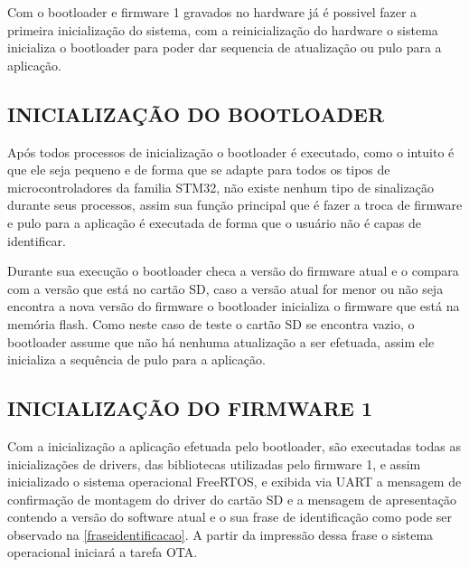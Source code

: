 Com o bootloader e firmware 1 gravados no hardware já é possivel fazer a primeira inicialização do sistema, com a reinicialização do hardware o sistema inicializa o bootloader para poder dar sequencia de atualização ou pulo para a aplicação.

\subsection{INICIALIZAÇÃO DO BOOTLOADER}
Após todos processos de inicialização o bootloader é executado, como o intuito é que ele seja pequeno e de forma que se adapte para todos os tipos de microcontroladores da familia STM32, não existe nenhum tipo de sinalização durante seus processos, assim sua função principal que é fazer a troca de firmware e pulo para a aplicação é executada de forma que o usuário não é capas de identificar.

Durante sua execução o bootloader checa a versão do firmware atual e o compara com a versão que está no cartão SD, caso a versão atual for menor ou não seja encontra a nova versão do firmware o bootloader inicializa o firmware que está na memória flash. Como neste caso de teste o cartão SD se encontra vazio, o bootloader assume que não há nenhuma atualização a ser efetuada, assim ele inicializa a sequência de pulo para a aplicação. 
\subsection{INICIALIZAÇÃO DO FIRMWARE 1}
Com a inicialização a aplicação efetuada pelo bootloader, são executadas todas as inicializações de drivers, das bibliotecas utilizadas pelo firmware 1, e assim inicializado o sistema operacional FreeRTOS, e exibida via UART a mensagem de confirmação de montagem do driver do cartão SD e a mensagem de apresentação contendo a versão do software atual e o sua frase de identificação como pode ser observado na \autoref{fraseidentificacao}. A partir da impressão dessa frase o sistema operacional iniciará a tarefa OTA.

